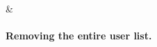 \begin{table}
\begin{tabularx}{\textwidth}
\begin{itemize}
		\end{itemize} &
		\paragraph{Removing the entire user list.}
		\\
		\hline
	\end{tabularx}
\end{table}

